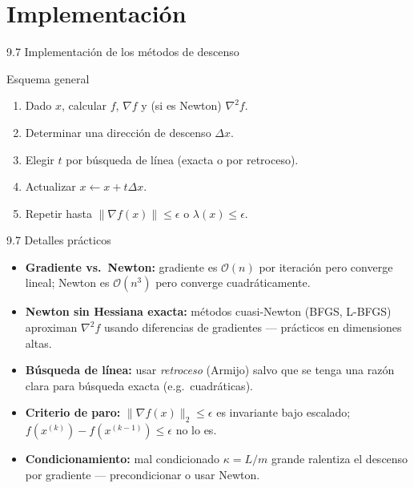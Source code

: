\documentclass[10pt,aspectratio=169]{beamer}
\newcommand{\Hess}{\nabla^{2} f}
\begin{document}
\section{Implementación}
\begin{frame}{9.7 Implementación de los métodos de descenso}
  \begin{block}{Esquema general}
    \begin{enumerate}
      \item Dado $x$, calcular $f$, $\nabla f$ y (si es Newton) $\Hess$.
      \item Determinar una dirección de descenso $\Delta x$.
      \item Elegir $t$ por búsqueda de línea (exacta o por retroceso).
      \item Actualizar $x \leftarrow x + t \Delta x$.
      \item Repetir hasta $\|\nabla f(x)\| \le \epsilon$ o $\lambda(x) \le \epsilon$.
    \end{enumerate}
  \end{block}
\end{frame}

\begin{frame}{9.7 Detalles prácticos}
  \begin{itemize}
    \item \textbf{Gradiente vs.\ Newton:} gradiente es $\mathcal{O}(n)$ por iteración pero
          converge lineal; Newton es $\mathcal{O}(n^{3})$ pero converge cuadráticamente.
    \item \textbf{Newton sin Hessiana exacta:} métodos cuasi-Newton (BFGS, L-BFGS)
          aproximan $\Hess$ usando diferencias de gradientes --- prácticos
          en dimensiones altas.
    \item \textbf{Búsqueda de línea:} usar \emph{retroceso} (Armijo) salvo que se tenga
          una razón clara para búsqueda exacta (e.g.\ cuadráticas).
    \item \textbf{Criterio de paro:} $\|\nabla f(x)\|_{2} \le \epsilon$ es
          invariante bajo escalado; $f(x^{(k)}) - f(x^{(k-1)}) \le \epsilon$ no lo es.
    \item \textbf{Condicionamiento:} mal condicionado $\kappa = L/m$ grande
          ralentiza el descenso por gradiente --- precondicionar o usar Newton.
  \end{itemize}
\end{frame}

\end{document}
